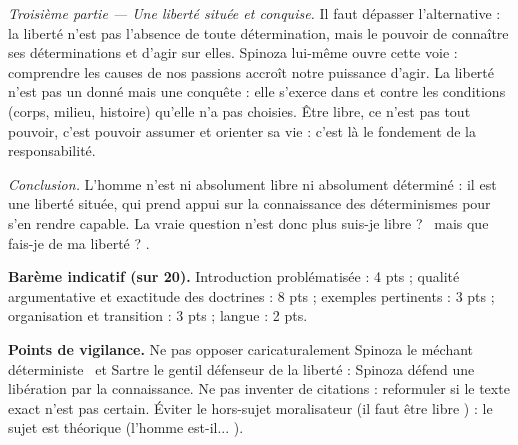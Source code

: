\documentclass[11pt]{article}
\begin{document}
\begin{corrige}
\emph{Troisième partie — Une liberté située et conquise.} Il faut dépasser l'alternative : la liberté n'est pas l'absence de toute détermination, mais le pouvoir de connaître ses déterminations et d'agir sur elles. Spinoza lui-même ouvre cette voie : comprendre les causes de nos passions accroît notre puissance d'agir. La liberté n'est pas un donné mais une conquête : elle s'exerce dans et contre les conditions (corps, milieu, histoire) qu'elle n'a pas choisies. Être libre, ce n'est pas tout pouvoir, c'est pouvoir assumer et orienter sa vie : c'est là le fondement de la responsabilité.

\emph{Conclusion.} L'homme n'est ni absolument libre ni absolument déterminé : il est une liberté située, qui prend appui sur la connaissance des déterminismes pour s'en rendre capable. La vraie question n'est donc plus \guillemotleft suis-je libre ? \guillemotright\ mais \guillemotleft que fais-je de ma liberté ? \guillemotright.

\textbf{Barème indicatif (sur 20).} Introduction problématisée : 4 pts ; qualité argumentative et exactitude des doctrines : 8 pts ; exemples pertinents : 3 pts ; organisation et transition : 3 pts ; langue : 2 pts.

\textbf{Points de vigilance.} Ne pas opposer caricaturalement \guillemotleft Spinoza le méchant déterministe \guillemotright\ et \guillemotleft Sartre le gentil défenseur de la liberté \guillemotright : Spinoza défend une libération par la connaissance. Ne pas inventer de citations : reformuler si le texte exact n'est pas certain. Éviter le hors-sujet moralisateur (\guillemotleft il faut être libre \guillemotright) : le sujet est théorique (\guillemotleft l'homme est-il... \guillemotright).
\end{corrige}
\end{document}
